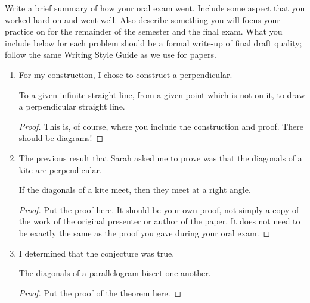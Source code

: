 \date{\today}



\maketitle

Write a brief summary of how your oral exam went.  Include some aspect that you worked hard on and went well.  Also describe something you will focus your practice on for the remainder of the semester and the final exam.  What you include below for each problem should be a formal write-up of final draft quality; follow the same Writing Style Guide as we use for papers.

% 
\begin{enumerate}
\item  For my construction, I chose to construct a perpendicular.
\setcounter{section}{1}
\setcounter{theorem}{12}
\begin{euclidtheorem}
To a given infinite straight line, from a given point which is not on it, to draw a perpendicular straight line.
\end{euclidtheorem}
\begin{proof}
This is, of course, where you include the construction and proof.  There should be diagrams!
\end{proof}

\item  The previous result that Sarah asked me to prove was that the diagonals of a kite are perpendicular.
\setcounter{section}{2}
\setcounter{theorem}{4}
\begin{theorem}
If the diagonals of a kite meet, then they meet at a right angle.
\end{theorem}
\begin{proof}
Put the proof here.  It should be your own proof, not simply a copy of the work of the original presenter or author of the paper.  It does not need to be exactly the same as the proof you gave during your oral exam.
\end{proof}

\item  I determined that the conjecture was true.
\begin{theorem*}
The diagonals of a parallelogram bisect one another.
\end{theorem*}
\begin{proof}
Put the proof of the theorem here.
\end{proof}


\end{enumerate}
